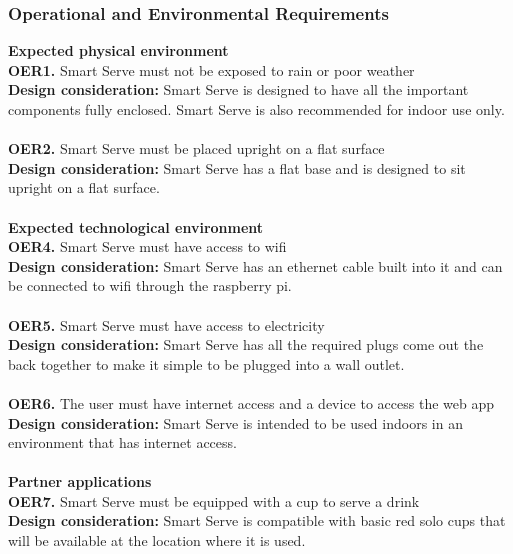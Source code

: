 \documentclass[12pt, titlepage]{article}
\begin{document}
\subsubsection{Operational and Environmental Requirements}
    \textbf{Expected physical environment}\\
        \noindent\textbf{OER1.} Smart Serve must not be exposed to rain or poor weather \\
        \indent\textbf{Design consideration:} Smart Serve is designed to have all the important components fully enclosed. Smart Serve is also recommended for indoor use only.\\\\
        \textbf{OER2.} Smart Serve must be placed upright on a flat surface \\
        \indent\textbf{Design consideration:} Smart Serve has a flat base and is designed to sit upright on a flat surface.\\\\
    \textbf{Expected technological environment}\\
        \noindent\textbf{OER4.} Smart Serve must have access to wifi \\
        \indent\textbf{Design consideration:} Smart Serve has an ethernet cable built into it and can be connected to wifi through the raspberry pi.\\\\
        \textbf{OER5.} Smart Serve must have access to electricity \\
        \indent\textbf{Design consideration:} Smart Serve has all the required plugs come out the back together to make it simple to be plugged into a wall outlet.\\\\
        \textbf{OER6.} The user must have internet access and a device to access the web app \\
        \indent\textbf{Design consideration:} Smart Serve is intended to be used indoors in an environment that has internet access.\\\\
    \textbf{Partner applications}\\
        \noindent\textbf{OER7.} Smart Serve must be equipped with a cup to serve a drink \\
        \indent\textbf{Design consideration:} Smart Serve is compatible with basic red solo cups that will be available at the location where it is used.
\end{document}
